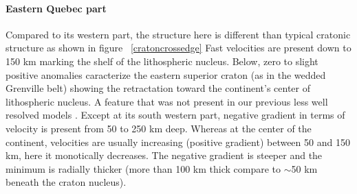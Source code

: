 \documentclass[12pt]{article}
\begin{document}




		\paragraph{Eastern Quebec part}
			Compared to its western part, the structure here is different than typical cratonic structure as shown in figure ~\ref{cratoncrossedge} 
			Fast velocities are present down to 150 km marking the shelf of the lithospheric nucleus. 
			Below, zero to slight positive anomalies caracterize the eastern superior craton (as in the wedded Grenville belt) showing the retractation toward the continent's center of lithospheric nucleus. A feature that was not present in our previous less well resolved models \citep{marone2007three,yuan20113,yuan2014multiscale}.
			Except at its south western part, negative gradient in terms of velocity is present from 50 to 250 km deep. 
			Whereas at the center of the continent, velocities are usually increasing (positive gradient) between 50 and 150 km, here it monotically decreases.
			The negative gradient is steeper and the minimum is radially thicker (more than 100 km thick compare to $\sim$50 km beneath the craton nucleus). 
\end{document}
